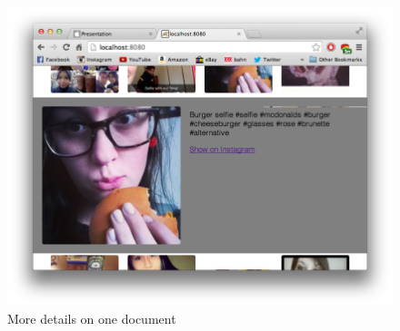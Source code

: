 \documentclass[11pt]{article}
\begin{document}
	\begin{figure}[H]
		\includegraphics[keepaspectratio,width=\textwidth]{screenshot3.png}
		\caption{More details on one document}
	\end{figure}
\end{document}
